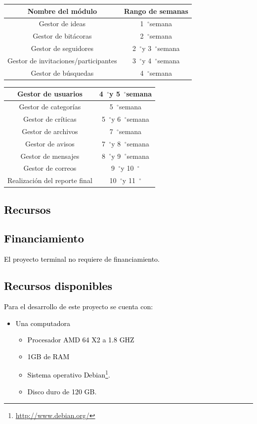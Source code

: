 \documentclass[11pt,letterpaper,titlepage]{article}
\newcommand{\grad}{\hspace{-2mm}$\phantom{a}^{\circ}$}
\begin{document}
\begin{center}
\begin{tabular}{|c|c|}\hline
Nombre del m\'odulo & Rango de semanas\\ \hline\hline
Gestor de ideas&1\grad semana \\ \hline
Gestor de bit\'acoras&2\grad semana \\ \hline
Gestor de seguidores&2\grad y 3\grad semana\\ \hline
Gestor de invitaciones/participantes&3\grad y 4\grad semana \\ \hline
Gestor de b\'usquedas&4\grad semana \\ \hline
\end{tabular}
\end{center}
\begin{center}
\begin{tabular}{|c|c|}\hline
Gestor de usuarios&4\grad y 5\grad semana \\ \hline
Gestor de categor\'ias&5\grad semana \\ \hline
Gestor de cr\'iticas&5\grad y 6\grad semana \\ \hline
Gestor de archivos&7\grad semana\\ \hline
Gestor de avisos&7\grad y 8\grad semana\\ \hline
Gestor de mensajes&8\grad y 9\grad semana\\ \hline
Gestor de correos&9\grad y 10\grad \\ \hline
Realizaci\'on del reporte final&10\grad y 11\grad \\ \hline
\end{tabular}
\end{center}


\textcolor{black}{
\section{Recursos}
\subsection{Financiamiento}
El proyecto terminal no requiere de financiamiento.
\subsection{Recursos disponibles}
Para el desarrollo de este proyecto se cuenta con:}
\begin{itemize}
 \item \textcolor{black}{Una computadora}
  \begin{itemize}
   \item \textcolor{black}{Procesador AMD 64 X2  a 1.8 GHZ }
   \item \textcolor{black}{1GB de RAM}
   \item \textcolor{black}{Sistema operativo Debian\footnote{\href{http://www.debian.org/}{http://www.debian.org/}}.}
   \item \textcolor{black}{Disco duro de 120 GB.}
  \end{itemize}

\end{itemize}
\end{document}
